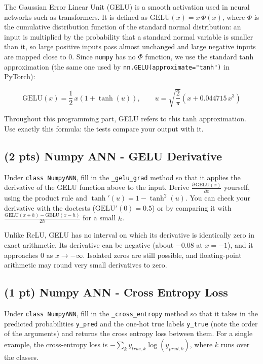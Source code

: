 \documentclass[11pt]{exam}
\begin{document}
The Gaussian Error Linear Unit (GELU) is a smooth activation used in neural networks such as transformers. It is defined as $\text{GELU}(x) = x\,\Phi(x)$, where $\Phi$ is the cumulative distribution function of the standard normal distribution: an input is multiplied by the probability that a standard normal variable is smaller than it, so large positive inputs pass almost unchanged and large negative inputs are mapped close to 0. Since \verb|numpy| has no $\Phi$ function, we use the standard tanh approximation (the same one used by \verb|nn.GELU(approximate="tanh")| in PyTorch):

$$ \text{GELU}(x) = \frac{1}{2}\, x \left(1 + \tanh(u)\right), \qquad u = \sqrt{\frac{2}{\pi}}\left(x + 0.044715\, x^3\right) $$

Throughout this programming part, GELU refers to this tanh approximation. Use exactly this formula: the tests compare your output with it.

\subsection{(2 pts) Numpy ANN - GELU Derivative}

Under \verb|class NumpyANN|, fill in the \verb|_gelu_grad| method so that it applies the derivative of the GELU function above to the input. Derive $\frac{\partial\, \text{GELU}(x)}{\partial x}$ yourself, using the product rule and $\tanh'(u) = 1 - \tanh^2(u)$. You can check your derivative with the doctests ($\text{GELU}'(0) = 0.5$) or by comparing it with $\frac{\text{GELU}(x+h) - \text{GELU}(x-h)}{2h}$ for a small $h$.

Unlike ReLU, GELU has no interval on which its derivative is identically zero in exact arithmetic. Its derivative can be negative (about $-0.08$ at $x=-1$), and it approaches 0 as $x \to -\infty$. Isolated zeros are still possible, and floating-point arithmetic may round very small derivatives to zero.

\subsection{(1 pt) Numpy ANN - Cross Entropy Loss}

Under \verb|class NumpyANN|, fill in the \verb|_cross_entropy| method so that it takes in the predicted probabilities \verb|y_pred| and the one-hot true labels \verb|y_true| (note the order of the arguments) and returns the cross entropy loss between them. For a single example, the cross-entropy loss is $- \sum_{k} y_{true, k} \log(y_{pred, k})$, where $k$ runs over the classes.
\end{document}
